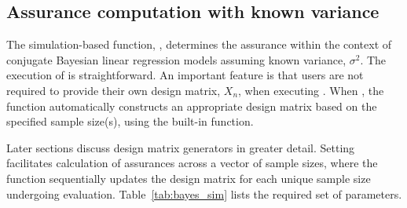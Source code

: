 \subsection{Assurance computation with known variance}
\label{sec:assur_knownvar}
The simulation-based function, 
, determines the assurance
within the context of conjugate Bayesian linear regression models
assuming known variance, $\sigma^2$.
The execution of  is straightforward. 
An important feature is that users are not required to 
provide their own design matrix,
$X_n$, when executing .
When , the function automatically 
constructs an appropriate design matrix based on the
specified sample size(s), using the built-in  
function. 

Later sections discuss design matrix
generators in greater detail. 
Setting  facilitates calculation
of assurances across
a vector of sample sizes, where the function sequentially 
updates the design matrix for each unique sample
size undergoing evaluation. Table~\ref{tab:bayes_sim} 
lists the required set of parameters. 

